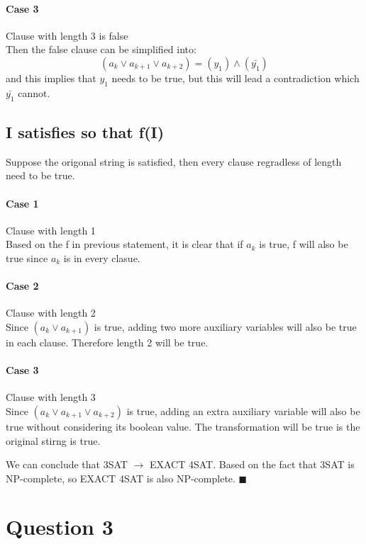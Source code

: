 \documentclass{article}
\begin{document}
\paragraph*{Case 3} Clause with length 3 is false \\
Then the false clause can be simplified into:
$$(a_k \vee a_{k+1} \vee a_{k+2}) = (y_1) \wedge (\bar{y_1})$$
and this implies that $y_1$ needs to be true, but this will lead a contradiction which $\bar{y_1}$ cannot.


\subsection*{I satisfies so that f(I)}
Suppose the origonal string is satisfied, then every clause regradless of length need to be true. 
\paragraph*{Case 1} Clause with length 1 \\
Based on the f in previous statement, it is clear that if $a_k$ is true, f will also be true since $a_k$ is in every clasue.

\paragraph*{Case 2} Clause with length 2 \\
Since $(a_k \vee a_{k+1})$ is true, adding two more auxiliary variables will also be true in each clause. Therefore length 2 will be true.

\paragraph*{Case 3} Clause with length 3 \\
Since $(a_k \vee a_{k+1} \vee a_{k+2})$ is true, adding an extra auxiliary variable will also be true without considering its boolean value.
The transformation will be true is the original stirng is true.

We can conclude that 3SAT $\rightarrow$ EXACT 4SAT. Based on the fact that 3SAT is NP-complete,
so EXACT 4SAT is also NP-complete. $\blacksquare$






\section*{Question 3}
\end{document}
